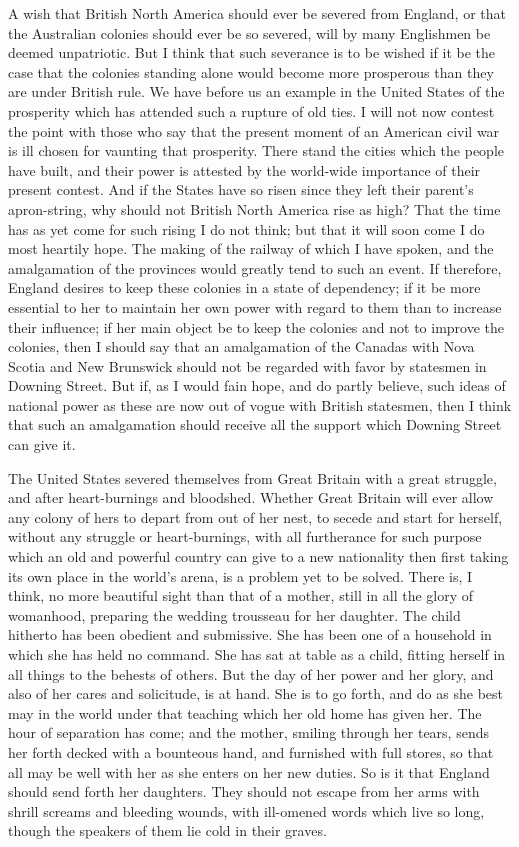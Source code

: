 A wish that British North America should ever be severed from
England, or that the Australian colonies should ever be so severed,
will by many Englishmen be deemed unpatriotic.  But I think that
such severance is to be wished if it be the case that the colonies
standing alone would become more prosperous than they are under
British rule.  We have before us an example in the United States of
the prosperity which has attended such a rupture of old ties.  I
will not now contest the point with those who say that the present
moment of an American civil war is ill chosen for vaunting that
prosperity.  There stand the cities which the people have built,
and their power is attested by the world-wide importance of their
present contest.  And if the States have so risen since they left
their parent's apron-string, why should not British North America
rise as high?  That the time has as yet come for such rising I do
not think; but that it will soon come I do most heartily hope.  The
making of the railway of which I have spoken, and the amalgamation
of the provinces would greatly tend to such an event.  If
therefore, England desires to keep these colonies in a state of
dependency; if it be more essential to her to maintain her own
power with regard to them than to increase their influence; if her
main object be to keep the colonies and not to improve the
colonies, then I should say that an amalgamation of the Canadas
with Nova Scotia and New Brunswick should not be regarded with
favor by statesmen in Downing Street.  But if, as I would fain
hope, and do partly believe, such ideas of national power as these
are now out of vogue with British statesmen, then I think that such
an amalgamation should receive all the support which Downing Street
can give it.

The United States severed themselves from Great Britain with a
great struggle, and after heart-burnings and bloodshed.  Whether
Great Britain will ever allow any colony of hers to depart from out
of her nest, to secede and start for herself, without any struggle
or heart-burnings, with all furtherance for such purpose which an
old and powerful country can give to a new nationality then first
taking its own place in the world's arena, is a problem yet to be
solved.  There is, I think, no more beautiful sight than that of a
mother, still in all the glory of womanhood, preparing the wedding
trousseau for her daughter.  The child hitherto has been obedient
and submissive.  She has been one of a household in which she has
held no command.  She has sat at table as a child, fitting herself
in all things to the behests of others.  But the day of her power
and her glory, and also of her cares and solicitude, is at hand.
She is to go forth, and do as she best may in the world under that
teaching which her old home has given her.  The hour of separation
has come; and the mother, smiling through her tears, sends her
forth decked with a bounteous hand, and furnished with full stores,
so that all may be well with her as she enters on her new duties.
So is it that England should send forth her daughters.  They should
not escape from her arms with shrill screams and bleeding wounds,
with ill-omened words which live so long, though the speakers of
them lie cold in their graves.

